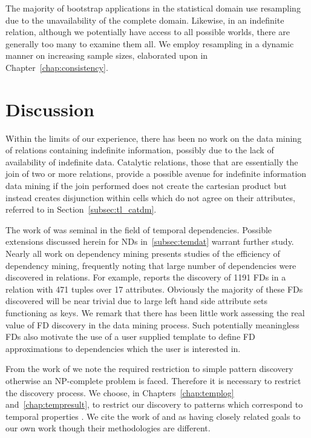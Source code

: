 \smallskip

The majority of bootstrap applications in the statistical domain use
resampling due to the unavailability of the complete domain. Likewise,
in an indefinite relation, although we potentially have access to all
possible worlds, there are generally too many to examine them all. We
employ resampling in a dynamic manner on increasing sample sizes,
elaborated upon in Chapter~\ref{chap:consistency}. 

\section{Discussion}


Within the limits of our experience, there has
been no work on the data mining of relations containing indefinite
information, possibly due to the lack of availability of indefinite data.
Catalytic relations, those that are essentially the join of
two or more relations, provide a possible avenue for indefinite
information data mining if the join performed does not create the
cartesian product but instead creates disjunction within cells which
do not agree on their attributes, referred to in
Section~\ref{subsec:tl_catdm}. 

\medskip

The work of \cite{Via87,Via88} was seminal in the field of temporal
dependencies. Possible extensions discussed herein for NDs
in~\ref{subsec:temdat} warrant
further study. Nearly all work on dependency mining
\cite{Mann92,km95,sf93,bb95,hkp98} presents studies of the efficiency
of dependency mining, frequently noting that large number of
dependencies were discovered in relations. For example, \cite{sf93}
reports the discovery of 1191 FDs in a relation with 471 tuples over
17 attributes. Obviously the majority of these FDs discovered will
be near trivial due to large left hand side attribute sets functioning as
keys. We remark that there has been little work assessing the
real value of FD discovery in the data mining process. Such
potentially meaningless FDs also motivate the use of a user supplied
template to 
define FD approximations to dependencies which the user is interested
in.  

\medskip

From the work of \cite{mt96,bt98} we note the required restriction to
simple pattern discovery otherwise an NP-complete problem is
faced. Therefore it is necessary to restrict the discovery process. We
choose, in Chapters~\ref{chap:templog} and~\ref{chap:tempresult}, to
restrict our discovery to patterns which correspond to temporal
properties \cite{mp92}. We cite the work of
\cite{dlm98} and \cite{bt98} as having closely related goals to our
own work though 
their methodologies are different.





